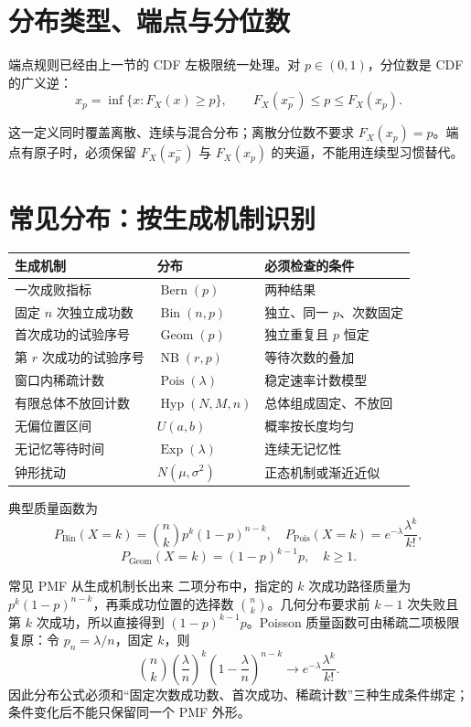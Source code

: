 \documentclass[11pt,a4paper]{ctexart}
\begin{document}
\section{分布类型、端点与分位数}

端点规则已经由上一节的 CDF 左极限统一处理。对 $p\in(0,1)$，分位数是 CDF 的广义逆：
\[
\boxed{x_p=\inf\{x:F_X(x)\ge p\}},
\qquad F_X(x_p^-)\le p\le F_X(x_p).
\]

这一定义同时覆盖离散、连续与混合分布；离散分位数不要求 $F_X(x_p)=p$。端点有原子时，必须保留 $F_X(x_p^-)$ 与 $F_X(x_p)$ 的夹逼，不能用连续型习惯替代。

\section{常见分布：按生成机制识别}

\begin{center}
\begin{tabularx}{\linewidth}{L{3.4cm}L{3.4cm}Y}
\toprule
生成机制 & 分布 & 必须检查的条件 \\
\midrule
一次成败指标 & $\operatorname{Bern}(p)$ & 两种结果 \\
固定 $n$ 次独立成功数 & $\operatorname{Bin}(n,p)$ & 独立、同一 $p$、次数固定 \\
首次成功的试验序号 & $\operatorname{Geom}(p)$ & 独立重复且 $p$ 恒定 \\
第 $r$ 次成功的试验序号 & $\operatorname{NB}(r,p)$ & 等待次数的叠加 \\
窗口内稀疏计数 & $\operatorname{Pois}(\lambda)$ & 稳定速率计数模型 \\
有限总体不放回计数 & $\operatorname{Hyp}(N,M,n)$ & 总体组成固定、不放回 \\
无偏位置区间 & $U(a,b)$ & 概率按长度均匀 \\
无记忆等待时间 & $\operatorname{Exp}(\lambda)$ & 连续无记忆性 \\
钟形扰动 & $N(\mu,\sigma^2)$ & 正态机制或渐近近似 \\
\bottomrule
\end{tabularx}
\end{center}

典型质量函数为
\[
P_{\operatorname{Bin}}(X=k)=\binom nkp^k(1-p)^{n-k},\quad
P_{\operatorname{Pois}}(X=k)=e^{-\lambda}\frac{\lambda^k}{k!},
\]
\[
P_{\operatorname{Geom}}(X=k)=(1-p)^{k-1}p,\quad k\ge1.
\]
\begin{methodbox}{常见 PMF 从生成机制长出来}
二项分布中，指定的 $k$ 次成功路径质量为 $p^k(1-p)^{n-k}$，再乘成功位置的选择数 $\binom nk$。几何分布要求前 $k-1$ 次失败且第 $k$ 次成功，所以直接得到 $(1-p)^{k-1}p$。Poisson 质量函数可由稀疏二项极限复原：令 $p_n=\lambda/n$，固定 $k$，则
\[
\binom nk\left(\frac\lambda n\right)^k
\left(1-\frac\lambda n\right)^{n-k}
\longrightarrow e^{-\lambda}\frac{\lambda^k}{k!}.
\]
因此分布公式必须和“固定次数成功数、首次成功、稀疏计数”三种生成条件绑定；条件变化后不能只保留同一个 PMF 外形。
\end{methodbox}
\end{document}
